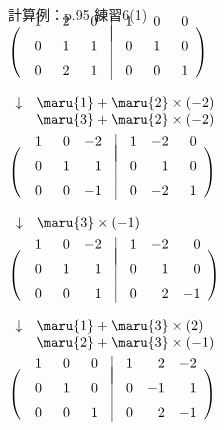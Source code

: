 \documentclass[a4paper,10pt,onecolumn,oneside,notitlepage,final]{jsarticle} %
\begin{document}
\setlength{\columnsep}{9mm}
\begin{multicols}{2}
計算例：p.95 練習6(1)\\%

$\left(\begin{array}{rrr@{\quad}|rrr}
\quad&\quad&\quad&\quad&\quad&\quad\\[-7mm]
   1&   2&   0&   1&   0&   0\\[2mm]
   0&   1&   1&   0&   1&   0\\[2mm]
   0&   2&   1&   0&   0&   1
\end{array}\right)$\par
$\begin{array}{ll}
\downarrow
&\maru{1}+\maru{2}\times(-2)\\
&\maru{3}+\maru{2}\times(-2)\\
\end{array}$\par
$\left(\begin{array}{rrr@{\quad}|rrr}
\quad&\quad&\quad&\quad&\quad&\quad\\[-7mm]
   1&   0&  -2&   1&  -2&   0\\[2mm]
   0&   1&   1&   0&   1&   0\\[2mm]
   0&   0&  -1&   0&  -2&   1
\end{array}\right)$\par
$\begin{array}{ll}
\downarrow
&\maru{3}\times(-1)\\
\end{array}$\par
$\left(\begin{array}{rrr@{\quad}|rrr}
\quad&\quad&\quad&\quad&\quad&\quad\\[-7mm]
   1&   0&  -2&   1&  -2&   0\\[2mm]
   0&   1&   1&   0&   1&   0\\[2mm]
   0&   0&   1&   0&   2&  -1
\end{array}\right)$\par
$\begin{array}{ll}
\downarrow
&\maru{1}+\maru{3}\times(2)\\
&\maru{2}+\maru{3}\times(-1)\\
\end{array}$\par
$\left(\begin{array}{rrr@{\quad}|rrr}
\quad&\quad&\quad&\quad&\quad&\quad\\[-7mm]
   1&   0&   0&   1&   2&  -2\\[2mm]
   0&   1&   0&   0&  -1&   1\\[2mm]
   0&   0&   1&   0&   2&  -1
\end{array}\right)$\par


\end{multicols}
\end{document}
